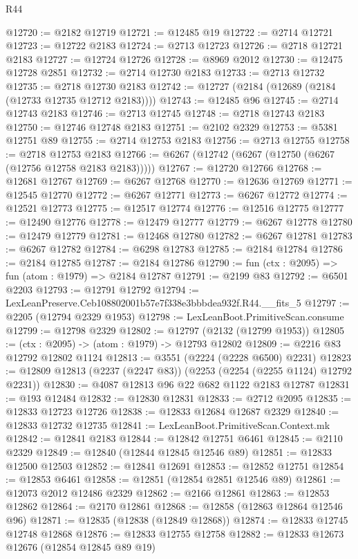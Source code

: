 \begin{lexlean}{R44}
\begin{coremodule}
@12720 := @2182 @12719
@12721 := @12485 @19
@12722 := @2714 @12721
@12723 := @12722 @2183
@12724 := @2713 @12723
@12726 := @2718 @12721 @2183
@12727 := @12724 @12726
@12728 := @8969 @2012
@12730 := @12475 @12728 @2851
@12732 := @2714 @12730 @2183
@12733 := @2713 @12732
@12735 := @2718 @12730 @2183
@12742 := @12727 (@2184 (@12689 (@2184 (@12733 @12735 @12712 @2183))))
@12743 := @12485 @96
@12745 := @2714 @12743 @2183
@12746 := @2713 @12745
@12748 := @2718 @12743 @2183
@12750 := @12746 @12748 @2183
@12751 := @2102 @2329
@12753 := @5381 @12751 @89
@12755 := @2714 @12753 @2183
@12756 := @2713 @12755
@12758 := @2718 @12753 @2183
@12766 := @6267 (@12742 (@6267 (@12750 (@6267 (@12756 @12758 @2183 @2183)))))
@12767 := @12720 @12766
@12768 := @12681 @12767
@12769 := @6267 @12768
@12770 := @12636 @12769
@12771 := @12545 @12770
@12772 := @6267 @12771
@12773 := @6267 @12772
@12774 := @12521 @12773
@12775 := @12517 @12774
@12776 := @12516 @12775
@12777 := @12490 @12776
@12778 := @12479 @12777
@12779 := @6267 @12778
@12780 := @12479 @12779
@12781 := @12468 @12780
@12782 := @6267 @12781
@12783 := @6267 @12782
@12784 := @6298 @12783
@12785 := @2184 @12784
@12786 := @2184 @12785
@12787 := @2184 @12786
@12790 := fun (ctx : @2095) => fun (atom : @1979) => @2184 @12787
@12791 := @2199 @83
@12792 := @6501 @2203
@12793 := @12791 @12792
@12794 := LexLeanPreserve.Ceb108802001b57e7f338e3bbbdea932f.R44.__fits_5
@12797 := @2205 (@12794 @2329 @1953)
@12798 := LexLeanBoot.PrimitiveScan.consume
@12799 := @12798 @2329
@12802 := @12797 (@2132 (@12799 @1953))
@12805 := (ctx : @2095) -> (atom : @1979) -> @12793 @12802
@12809 := @2216 @83 @12792 @12802 @1124
@12813 := @3551 (@2224 (@2228 @6500) @2231)
@12823 := @12809 @12813 (@2237 (@2247 @83)) (@2253 (@2254 (@2255 @1124) @12792 @2231))
@12830 := @4087 @12813 @96 @22 @682 @1122 @2183 @12787
@12831 := @193 @12484
@12832 := @12830 @12831
@12833 := @2712 @2095
@12835 := @12833 @12723 @12726
@12838 := @12833 @12684 @12687 @2329
@12840 := @12833 @12732 @12735
@12841 := LexLeanBoot.PrimitiveScan.Context.mk
@12842 := @12841 @2183
@12844 := @12842 @12751 @6461
@12845 := @2110 @2329
@12849 := @12840 (@12844 @12845 @12546 @89)
@12851 := @12833 @12500 @12503
@12852 := @12841 @12691
@12853 := @12852 @12751
@12854 := @12853 @6461
@12858 := @12851 (@12854 @2851 @12546 @89)
@12861 := @12073 @2012 @12486 @2329
@12862 := @2166 @12861
@12863 := @12853 @12862
@12864 := @2170 @12861
@12868 := @12858 (@12863 @12864 @12546 @96)
@12871 := @12835 (@12838 (@12849 @12868))
@12874 := @12833 @12745 @12748 @12868
@12876 := @12833 @12755 @12758
@12882 := @12833 @12673 @12676 (@12854 @12845 @89 @19)

\end{coremodule}
\end{lexlean}
